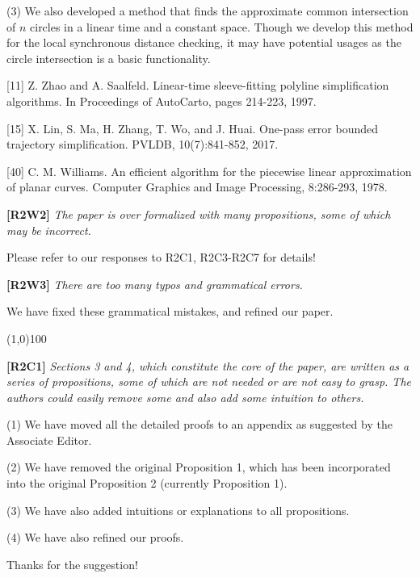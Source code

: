 \documentclass{letter}
\begin{document}
(3) We also developed a method that finds the approximate common intersection of $n$ circles in a linear time and a constant space. Though we develop this method for the local synchronous distance checking, it may have potential usages as the circle intersection is a basic functionality.


[11]  Z. Zhao and A. Saalfeld. Linear-time sleeve-fitting polyline simplification algorithms. In Proceedings of AutoCarto, pages 214-223, 1997.

[15] X. Lin, S. Ma, H. Zhang, T. Wo, and J. Huai. One-pass error bounded trajectory simplification. PVLDB, 10(7):841-852, 2017.

[40] C. M. Williams. An efficient algorithm for the piecewise linear approximation of planar curves. Computer Graphics and Image Processing, 8:286-293, 1978.



\textbf{[R2W2]} \emph{The paper is over formalized with many propositions, some of which may be incorrect.}

Please refer to our responses to R2C1, R2C3-R2C7 for details!

\textbf{[R2W3]} \emph{There are too many typos and grammatical errors.}

We have fixed these grammatical mistakes, and refined our paper.

\line(1,0){100}

\textbf{[R2C1]} \emph{Sections 3 and 4, which constitute the core of the paper, are written as a series of propositions, some of which are not needed or are not easy to grasp. The authors could easily remove some and also add some intuition to others.}

(1) We have moved all the detailed proofs to an appendix as suggested by the Associate Editor.

(2) We have removed the original Proposition 1, which has been incorporated into the original Proposition 2 (currently Proposition 1).

(3) We have also added intuitions or explanations to all propositions.

(4) We have also refined our proofs.

Thanks for the suggestion!

\end{document}
